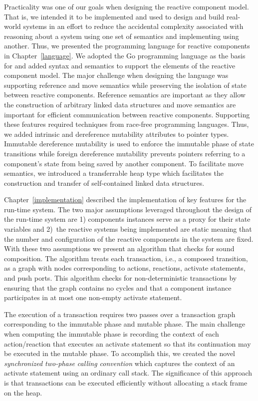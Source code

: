 Practicality was one of our goals when designing the reactive component model.
That is, we intended it to be implemented and used to design and build real-world systems in an effort to reduce the accidental complexity associated with reasoning about a system using one set of semantics and implementing using another.
Thus, we presented the \rcgo{} programming language for reactive components in Chapter~\ref{language}.
We adopted the Go programming language as the basis for \rcgo{} and added syntax and semantics to support the elements of the reactive component model.
The major challenge when designing the language was supporting reference and move semantics while preserving the isolation of state between reactive components.
Reference semantics are important as they allow the construction of arbitrary linked data structures and move semantics are important for efficient communication between reactive components.
Supporting these features required techniques from race-free programming languages.
Thus, we added intrinsic and dereference mutability attributes to pointer types.
Immutable dereference mutability is used to enforce the immutable phase of state transitions while foreign dereference mutability prevents pointers referring to a component's state from being saved by another component.
To facilitate move semantics, we introduced a transferrable heap type which facilitates the construction and transfer of self-contained linked data structures.

Chapter~\ref{implementation} described the implementation of key features for the \rcgo{} run-time system.
The two major assumptions leveraged throughout the design of the run-time system are 1) components instances serve as a proxy for their state variables and 2)~the reactive systems being implemented are static meaning that the number and configuration of the reactive components in the system are fixed.
With these two assumptions we present an algorithm that checks for sound composition.
The algorithm treats each transaction, i.e., a composed transition, as a graph with nodes corresponding to actions, reactions, activate statements, and push ports.
This algorithm checks for non-deterministic transactions by ensuring that the graph contains no cycles and that a component instance participates in at most one non-empty activate statement.

The execution of a transaction requires two passes over a transaction graph corresponding to the immutable phase and mutable phase.
The main challenge when computing the immutable phase is recording the context of each action/reaction that executes an activate statement so that its continuation may be executed in the mutable phase.
To accomplish this, we created the novel \emph{synchronized two-phase calling convention} which captures the context of an activate statement using an ordinary call stack.
The significance of this approach is that transactions can be executed efficiently without allocating a stack frame on the heap.

